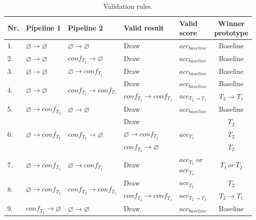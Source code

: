 \begin{table}[t]
\footnotesize
\centering
\begin{threeparttable}
\caption{
    Validation rules.
    }
\begin{tabular}{@{}lllllc@{}}
\toprule
Nr. & Pipeline 1 & Pipeline 2 & Valid result & Valid score & Winner prototype\\\toprule
         1. &$\varnothing \rightarrow \varnothing$ & $\varnothing \rightarrow \varnothing$ & Draw          & $acc_{baseline}$ &  Baseline \\ \hline
        2. &$\varnothing \rightarrow \varnothing$ & $con\!f_{T_2} \rightarrow \varnothing$ & Draw          & $acc_{baseline}$ & Baseline \\ \hline
        3. &$\varnothing \rightarrow \varnothing$ & $\varnothing \rightarrow con\!f_{T_1}$ & Draw          & $acc_{baseline}$ & Baseline \\ \hline
        \multirow{2}{*}{4.} &\multirow{2}{*}{$\varnothing \rightarrow \varnothing$} & \multirow{2}{*}{$con\!f_{T_2} \rightarrow con\!f_{T_1}$} & Draw & $acc_{baseline}$ & Baseline \\
        & & & $con\!f_{T_2} \rightarrow con\!f_{T_1}$ & $acc_{T_2 \rightarrow  T_1}$ & $T_2 \rightarrow T_1$\\ \hline
        5. & $\varnothing \rightarrow con\!f_{T_2}$ & $\varnothing \rightarrow \varnothing$ & Draw          & $acc_{baseline}$ & Baseline \\ \hline
        \multirow{3}{*}{6.} & \multirow{3}{*}{$\varnothing \rightarrow con\!f_{T_2}$} & \multirow{3}{*}{$con\!f_{T_2} \rightarrow \varnothing$} & Draw &  \multirow{3}{*}{$acc_{T_2}$}  & $T_2$ \\
        & & & $\varnothing \rightarrow con\!f_{T_2}$ & & $T_2$ \\
        & & & $con\!f_{T_2} \rightarrow \varnothing$ & & $T_2$ \\ \hline
        7. &$\varnothing \rightarrow con\!f_{T_2}$ & $\varnothing \rightarrow con\!f_{T_1}$ & Draw & $acc_{T_2}$ or $acc_{T_1}$ & $T_{1}\,or\, T_2$ \\ \hline
        \multirow{2}{*}{8.} & \multirow{2}{*}{$\varnothing \rightarrow con\!f_{T_2}$} & \multirow{2}{*}{$con\!f_{T_2} \rightarrow con\!f_{T_1}$} & Draw & $acc_{T_2}$ & $T_2$\\
        & & & $con\!f_{T_2} \rightarrow con\!f_{T_1}$ & $acc_{T_2 \rightarrow  T_1}$ & $T_2 \rightarrow T_1$ \\ \hline
        9. & $con\!f_{T_1} \rightarrow \varnothing$ & $\varnothing \rightarrow \varnothing$ & Draw & $acc_{baseline}$ & Baseline \\ \hline

\end{tabular}
\end{threeparttable}
\end{table}
